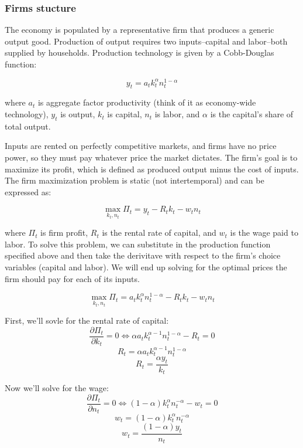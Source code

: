 \documentclass[12pt]{article}
\begin{document}
\subsubsection{Firms stucture}

The economy is populated by a representative firm that produces a generic output good. Production of output requires two inputs--capital and labor--both supplied by households. Production technology is given by a Cobb-Douglas function:

\begin{equation} 
y_t = a_t k_t^{\alpha} n_t^{1-\alpha}
\end{equation}

where \(a_t\) is aggregate factor productivity (think of it as economy-wide technology), \(y_t\) is output, \(k_t\) is capital, \(n_t\) is labor, and \(\alpha\) is the capital's share of total output.

Inputs are rented on perfectly competitive markets, and firms have no price power, so they must pay whatever price the market dictates. The firm's goal is to maximize its profit, which is defined as produced output minus the cost of inputs. The firm maximization problem is static (not intertemporal) and can be expressed as:

\[ \max_{k_t, n_t} \Pi_t = y_t - R_t k_t - w_t n_t \]

where \(\Pi_t\) is firm profit, \(R_t\) is the rental rate of capital, and \(w_t\) is the wage paid to labor. To solve this problem, we can substitute in the production function specified above and then take the derivitave with respect to the firm's choice variables (capital and labor). We will end up solving for the optimal prices the firm should pay for each of its inputs. 

\[ \max_{k_t, n_t} \Pi_t = a_t k_t^{\alpha} n_t^{1-\alpha} - R_t k_t - w_t n_t \]

First, we'll sovle for the rental rate of capital:
\[ \frac{\partial \Pi_t}{\partial k_t} = 0 \iff \alpha a_t k_t^{\alpha-1} n_t^{1-\alpha} - R_t = 0 \]
\[ R_t = \alpha a_t k_t^{\alpha-1} n_t^{1-\alpha} \]
\begin{equation}
R_t = \frac{\alpha y_t}{k_t}
\end{equation}

Now we'll solve for the wage:
\[ \frac{\partial \Pi_t}{\partial n_t} = 0 \iff (1-\alpha) k_t^{\alpha} n_t^{-\alpha} - w_t = 0 \]
\[ w_t = (1-\alpha) k_t^{\alpha} n_t^{-\alpha} \]
\begin{equation}
w_t = \frac{(1-\alpha) y_t}{n_t}
\end{equation}
\end{document}

